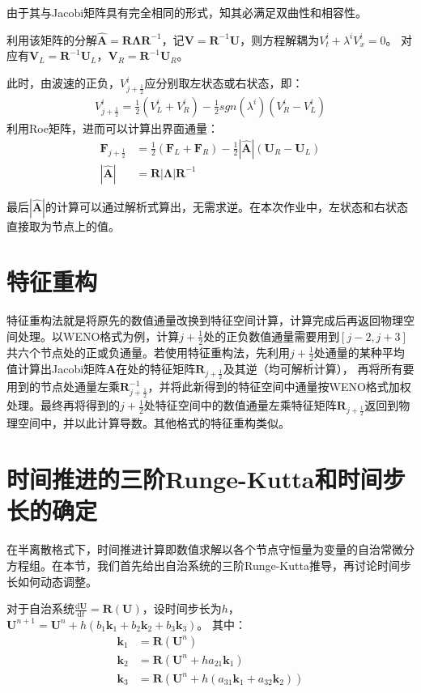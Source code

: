 \documentclass[12pt, a4paper]{article}
\begin{document}
由于其与Jacobi矩阵具有完全相同的形式，知其必满足双曲性和相容性。

利用该矩阵的分解$\widehat{\mathbf{A}} = \mathbf{R}\bm{\Lambda}\mathbf{R}^{-1}$，记$\mathbf{V}=\mathbf{R}^{-1}\mathbf{U}$，则方程解耦为$V^i_t+\lambda^iV^i_x=0$。
对应有$\mathbf{V}_L=\mathbf{R}^{-1}\mathbf{U}_L$，$\mathbf{V}_R=\mathbf{R}^{-1}\mathbf{U}_R$。

此时，由波速的正负，$V^i_{j+\frac{1}{2}}$应分别取左状态或右状态，即：
\begin{align}
    V^i_{j+\frac{1}{2}} = \frac{1}{2}(V^i_L+V^i_R) - \frac{1}{2}sgn(\lambda^i)(V^i_R-V^i_L)
\end{align}
利用Roe矩阵，进而可以计算出界面通量：
\begin{align}
    \mathbf{F}_{j+\frac{1}{2}} &= \frac{1}{2}(\mathbf{F}_L+\mathbf{F}_R)-\frac{1}{2}|\widehat{\mathbf{A}}|(\mathbf{U}_R-\mathbf{U}_L)\\
    |\widehat{\mathbf{A}}| &= \mathbf{R}|\bm{\Lambda}|\mathbf{R}^{-1}
\end{align}

最后$|\widehat{\mathbf{A}}|$的计算可以通过解析式算出，无需求逆。在本次作业中，左状态和右状态直接取为节点上的值。

\section{特征重构}
特征重构法就是将原先的数值通量改换到特征空间计算，计算完成后再返回物理空间处理。以WENO格式为例，计算$j+\frac{1}{2}$处的正负数值通量需要用到$[j-2,j+3]$共六个节点处的正或负通量。若使用特征重构法，先利用$j+\frac{1}{2}$处通量的某种平均值计算出Jacobi矩阵$\mathbf{A}$在处的特征矩阵$\mathbf{R}_{j+\frac{1}{2}}$及其逆（均可解析计算），
再将所有要用到的节点处通量左乘$\mathbf{R}_{j+\frac{1}{2}}^{-1}$，并将此新得到的特征空间中通量按WENO格式加权处理。最终再将得到的$j+\frac{1}{2}$处特征空间中的数值通量左乘特征矩阵$\mathbf{R}_{j+\frac{1}{2}}$返回到物理空间中，并以此计算导数。其他格式的特征重构类似。

\section{时间推进的三阶Runge-Kutta和时间步长的确定}
在半离散格式下，时间推进计算即数值求解以各个节点守恒量为变量的自治常微分方程组。在本节，我们首先给出自治系统的三阶Runge-Kutta推导，再讨论时间步长如何动态调整。

对于自治系统$\frac{\mathrm{d}\mathbf{U}}{\mathrm{d}t}=\mathbf{R}(\mathbf{U})$，设时间步长为$h$，$\mathbf{U}^{n+1} = \mathbf{U}^n + h(b_1\mathbf{k}_1+b_2\mathbf{k}_2+b_3\mathbf{k}_3)$。
其中：
\begin{align}
    \mathbf{k}_1 &= \mathbf{R}(\mathbf{U}^n)\\
    \mathbf{k}_2 &= \mathbf{R}(\mathbf{U}^n+ha_{21}\mathbf{k}_1)\\
    \mathbf{k}_3 &= \mathbf{R}(\mathbf{U}^n + h(a_{31}\mathbf{k}_1+a_{32}\mathbf{k}_2))
\end{align}
\end{document}
